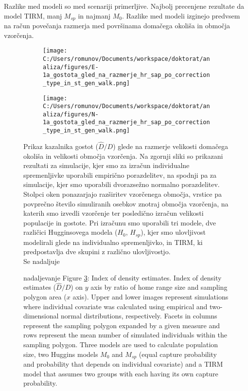 Razlike med modeli so med scenariji primerljive. Najbolj precenjene rezultate da model TIRM, manj $M_{sp}$ in najmanj $M_0$. Razlike med modeli izginejo predvsem na račun povečanja razmerja med površinama domačega okoliša in območja vzorčenja.

\begin{figure}[H]
  \centering
  \begin{subfigure}[b]{1\textwidth}
    \centering
    \texttt{[image: C:/Users/romunov/Documents/workspace/doktorat/analiza/figures/E-1a\_gostota\_gled\_na\_razmerje\_hr\_sap\_po\_correction\_type\_in\_st\_gen\_walk.png]}
    \label{sli:sub7.1}
  \end{subfigure}

  \begin{subfigure}[b]{1\textwidth}
    \centering
    \texttt{[image: C:/Users/romunov/Documents/workspace/doktorat/analiza/figures/N-1a\_gostota\_gled\_na\_razmerje\_hr\_sap\_po\_correction\_type\_in\_st\_gen\_walk.png]}
    \label{sli:sub7.2}
  \end{subfigure}
  \caption[Prikaz kazalnika gostot]{Prikaz kazalnika gostot ($\hat{D}/D$) glede na razmerje velikosti domačega okoliša in velikosti območja vzorčenja. Na zgornji sliki so prikazani rezultati za simulacije, kjer smo za izračun individualne spremenljivke uporabili empirično porazdelitev, na spodnji pa za simulacije, kjer smo uporabili dvorazsežno normalno porazdelitev. Stolpci oken ponazarjajo razširitev vzorčenega območja, vrstice pa povprečno število simuliranih osebkov znotraj območja vzorčenja, na katerih smo izvedli vzorčenje ter posledično izračun velikosti populacije in gostote. Pri izračunu smo uporabili tri modele, dve različici Hugginsovega modela ($H_0$, $H_{sp}$), kjer smo ulovljivost modelirali glede na individualno spremenljivko, in TIRM, ki predpostavlja dve skupini z različno ulovljivostjo.\\
  Se nadaljuje}
  \label{sli:slika7}
\end{figure}
\begin{figure}\ContinuedFloat
\caption*{nadaljevanje Figure \ref{sli:slika7}: Index of density estimates. Index of density estimates ($\hat{D}/D$) on $y$ axis by ratio of home range size and sampling polygon area ($x$ axis). Upper and lower images represent simulations where individual covariate was calculated using empirical and two-dimensional normal distributions, respectively. Facets in columns represent the sampling polygon expanded by a given measure and rows represent the mean number of simulated individuals within the sampling polygon. Three models are used to calculate population size, two Huggins models $M_0$ and $M_{sp}$ (equal capture probability and probability that depends on individual covariate) and a TIRM model that assumes two groups with each having its own capture probability.}
\end{figure}

